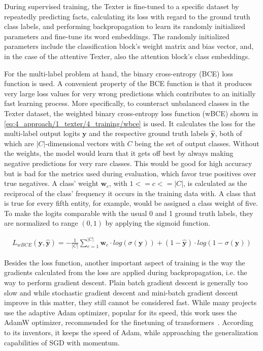 During supervised training, the Texter is fine-tuned to a specific dataset by repeatedly predicting facts, calculating its loss with regard to the ground truth class labels, and performing backpropagation to learn its randomly initialized parameters and fine-tune its word embeddings. The randomly initialized parameters include the classification block's weight matrix and bias vector, and, in the case of the attentive Texter, also the attention block's class embeddings.

For the multi-label problem at hand, the binary cross-entropy (BCE) loss function is used. A convenient property of the BCE function is that it produces very large loss values for very wrong predictions which contributes to an initially fast learning process. More specifically, to counteract unbalanced classes in the Texter dataset, the weighted binary cross-entropy loss function (wBCE) shown in \autoref{eq:4_approach/1_texter/4_training/wbce} is used. It calculates the loss for the multi-label output logits $\textbf{y}$ and the respective ground truth labels $\hat{\textbf{y}}$, both of which are $|C|$-dimensional vectors with $C$ being the set of output classes. Without the weights, the model would learn that it gets off best by always making negative predictions for very rare classes. This would be good for high accuracy but is bad for the metrics used during evaluation, which favor true positives over true negatives. A class' weight $\textbf{w}_c$, with $1 <= c <= |C|$, is calculated as the reciprocal of the class' frequency it occurs in the training data with. A class that is true for every fifth entity, for example, would be assigned a class weight of five. To make the logits comparable with the usual 0 and 1 ground truth labels, they are normalized to range $(0, 1)$ by applying the sigmoid function.

\begin{align}
    L_{wBCE}(\textbf{y}, \hat{\textbf{y}}) = - \frac{1}{|C|} \sum_{c = 1}^{|C|} \textbf{w}_c \cdot log(\sigma(\textbf{y})) + (1 - \hat{\textbf{y}}) \cdot log(1 - \sigma(\textbf{y}))
    \label{eq:4_approach/1_texter/4_training/wbce}
\end{align}

Besides the loss function, another important aspect of training is the way the gradients calculated from the loss are applied during backpropagation, i.e. the way to perform gradient descent. Plain batch gradient descent is generally too slow and while stochastic gradient descent and mini-batch gradient descent improve in this matter, they still cannot be considered fast. While many projects use the adaptive Adam optimizer, popular for its speed, this work uses the AdamW optimizer, recommended for the finetuning of transformers~\cite{Loshchilov2019DecoupledWD}. According to its inventors, it keeps the speed of Adam, while approaching the generalization capabilities of SGD with momentum.
